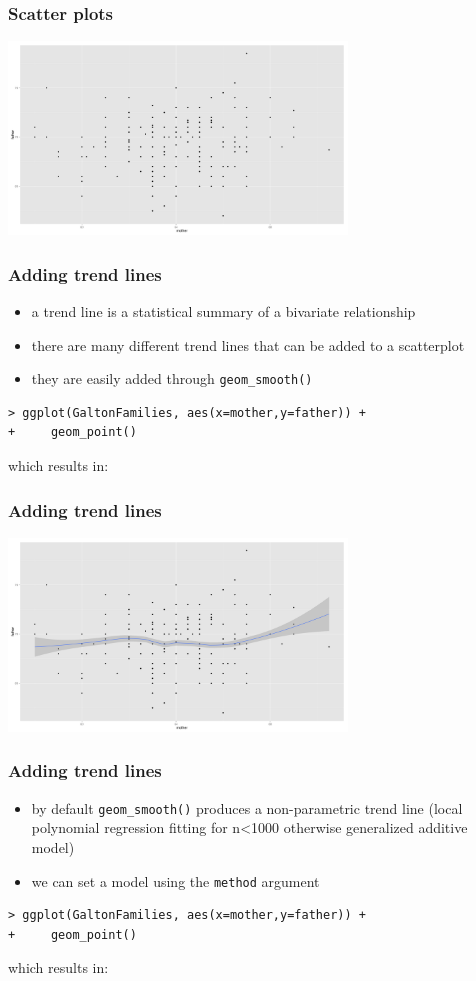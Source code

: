 \documentclass[xcolor={table}]{beamer}
\begin{document}
\begin{frame}\frametitle{Scatter plots}
  \begin{center}
    \includegraphics[width=9cm]{scatter.png}
  \end{center}
\end{frame}

\begin{frame}[fragile]\frametitle{Adding trend lines}
  \begin{itemize}
  \item a trend line is a statistical summary of a bivariate relationship
  \item there are many different trend lines that can be added to a scatterplot
  \item they are easily added through \texttt{geom\_smooth()}
  \end{itemize}\small
\begin{verbatim}
> ggplot(GaltonFamilies, aes(x=mother,y=father)) +
+     geom_point()
\end{verbatim}
which results in:
\end{frame}


\begin{frame}\frametitle{Adding trend lines}
  \begin{center}
    \includegraphics[width=9cm]{scattertrend1.png}
  \end{center}
\end{frame}


\begin{frame}[fragile]\frametitle{Adding trend lines}
  \begin{itemize}
  \item by default \texttt{geom\_smooth()} produces a non-parametric trend line (local polynomial regression fitting for n<1000 otherwise generalized additive model)
  \item we can set a model using the \texttt{method} argument
  \end{itemize}\small
\begin{verbatim}
> ggplot(GaltonFamilies, aes(x=mother,y=father)) +
+     geom_point()
\end{verbatim}
which results in:
\end{frame}
\end{document}

